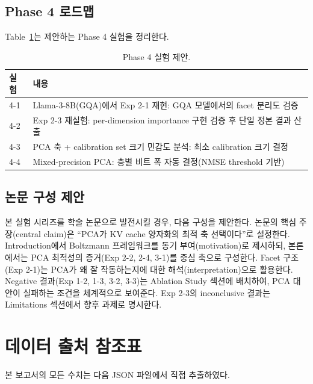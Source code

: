 \documentclass[11pt,a4paper]{article}
\begin{document}
\subsection{Phase 4 로드맵}

Table~\ref{tab:phase4}는 제안하는 Phase 4 실험을 정리한다.

\begin{table}[H]
\centering
\caption{Phase 4 실험 제안.}
\label{tab:phase4}
\begin{tabularx}{\textwidth}{lX}
\toprule
\textbf{실험} & \textbf{내용} \\
\midrule
4-1 & Llama-3-8B(GQA)에서 Exp 2-1 재현: GQA 모델에서의 facet 분리도 검증 \\
4-2 & Exp 2-3 재실험: per-dimension importance 구현 검증 후 단일 정본 결과 산출 \\
4-3 & PCA 축 + calibration set 크기 민감도 분석: 최소 calibration 크기 결정 \\
4-4 & Mixed-precision PCA: 층별 비트 폭 자동 결정(NMSE threshold 기반) \\
\bottomrule
\end{tabularx}
\end{table}

\subsection{논문 구성 제안}

본 실험 시리즈를 학술 논문으로 발전시킬 경우, 다음 구성을 제안한다.
논문의 핵심 주장(central claim)은 ``PCA가 KV cache 양자화의 최적 축 선택이다''로 설정한다.
Introduction에서 Boltzmann 프레임워크를 동기 부여(motivation)로 제시하되, 본론에서는 PCA 최적성의 증거(Exp 2-2, 2-4, 3-1)를 중심 축으로 구성한다.
Facet 구조(Exp 2-1)는 PCA가 왜 잘 작동하는지에 대한 해석(interpretation)으로 활용한다.
Negative 결과(Exp 1-2, 1-3, 3-2, 3-3)는 Ablation Study 섹션에 배치하여, PCA 대안이 실패하는 조건을 체계적으로 보여준다.
Exp 2-3의 inconclusive 결과는 Limitations 섹션에서 향후 과제로 명시한다.

\appendix
\section{데이터 출처 참조표}

본 보고서의 모든 수치는 다음 JSON 파일에서 직접 추출하였다.
\end{document}
